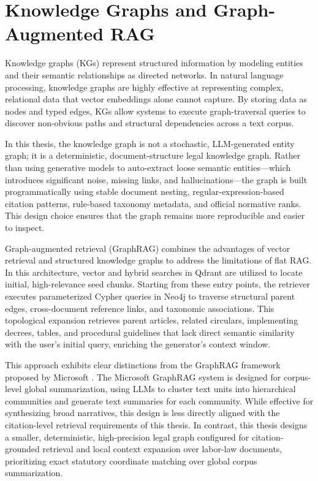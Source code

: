 \section{Knowledge Graphs and Graph-Augmented RAG}
Knowledge graphs (KGs) represent structured information by modeling entities and their semantic relationships as directed networks. In natural language processing, knowledge graphs are highly effective at representing complex, relational data that vector embeddings alone cannot capture. By storing data as nodes and typed edges, KGs allow systems to execute graph-traversal queries to discover non-obvious paths and structural dependencies across a text corpus.

In this thesis, the knowledge graph is not a stochastic, LLM-generated entity graph; it is a deterministic, document-structure legal knowledge graph. Rather than using generative models to auto-extract loose semantic entities—which introduces significant noise, missing links, and hallucinations—the graph is built programmatically using stable document nesting, regular-expression-based citation patterns, rule-based taxonomy metadata, and official normative ranks. This design choice ensures that the graph remains more reproducible and easier to inspect.

Graph-augmented retrieval (GraphRAG) combines the advantages of vector retrieval and structured knowledge graphs to address the limitations of flat RAG. In this architecture, vector and hybrid searches in Qdrant are utilized to locate initial, high-relevance seed chunks. Starting from these entry points, the retriever executes parameterized Cypher queries in Neo4j to traverse structural parent edges, cross-document reference links, and taxonomic associations. This topological expansion retrieves parent articles, related circulars, implementing decrees, tables, and procedural guidelines that lack direct semantic similarity with the user's initial query, enriching the generator's context window.

This approach exhibits clear distinctions from the GraphRAG framework proposed by Microsoft \cite{edge2024graphrag}. The Microsoft GraphRAG system is designed for corpus-level global summarization, using LLMs to cluster text units into hierarchical communities and generate text summaries for each community. While effective for synthesizing broad narratives, this design is less directly aligned with the citation-level retrieval requirements of this thesis. In contrast, this thesis designs a smaller, deterministic, high-precision legal graph configured for citation-grounded retrieval and local context expansion over labor-law documents, prioritizing exact statutory coordinate matching over global corpus summarization.

